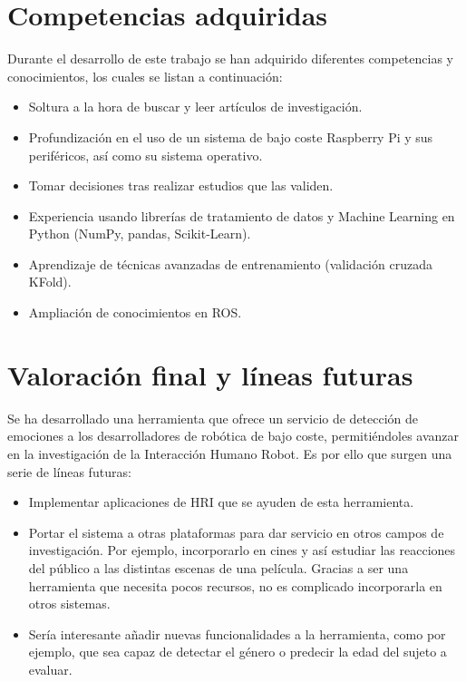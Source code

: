 \section{Competencias adquiridas}

Durante el desarrollo de este trabajo se han adquirido diferentes competencias y conocimientos, los cuales se listan a continuación:

\begin{itemize}
    \item Soltura a la hora de buscar y leer artículos de investigación.
    
    \item Profundización en el uso de un sistema de bajo coste Raspberry Pi y sus periféricos, así como su sistema operativo.
    
    \item Tomar decisiones tras realizar estudios que las validen.
    
    \item Experiencia usando librerías de tratamiento de datos y Machine Learning en Python (NumPy, pandas, Scikit-Learn).
    
    \item Aprendizaje de técnicas avanzadas de entrenamiento (validación cruzada KFold).
    
    \item Ampliación de conocimientos en ROS.
\end{itemize}

\section{Valoración final y líneas futuras}

Se ha desarrollado una herramienta que ofrece un servicio de detección de emociones a los desarrolladores de robótica de bajo coste, permitiéndoles avanzar en la investigación de la Interacción Humano Robot. Es por ello que surgen una serie de líneas futuras:

\begin{itemize}
    \item Implementar aplicaciones de HRI que se ayuden de esta herramienta.
    
    \item Portar el sistema a otras plataformas para dar servicio en otros campos de investigación. Por ejemplo, incorporarlo en cines y así estudiar las reacciones del público a las distintas escenas de una película. Gracias a ser una herramienta que necesita pocos recursos, no es complicado incorporarla en otros sistemas.
    
    \item Sería interesante añadir nuevas funcionalidades a la herramienta, como por ejemplo, que sea capaz de detectar el género o predecir la edad del sujeto a evaluar.
\end{itemize}

